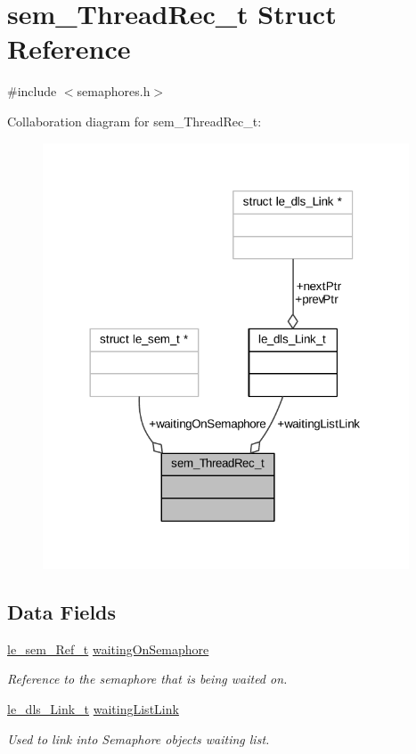 \hypertarget{structsem___thread_rec__t}{}\section{sem\+\_\+\+Thread\+Rec\+\_\+t Struct Reference}
\label{structsem___thread_rec__t}


{\ttfamily \#include $<$semaphores.\+h$>$}



Collaboration diagram for sem\+\_\+\+Thread\+Rec\+\_\+t\+:
\nopagebreak
\begin{figure}[H]
\begin{center}
\leavevmode
\includegraphics[width=308pt]{structsem___thread_rec__t__coll__graph}
\end{center}
\end{figure}
\subsection*{Data Fields}
\begin{DoxyCompactItemize}
\item 
\hyperlink{le__semaphore_8h_a25b1300f952a83efe8ad0a321f2d06dc}{le\+\_\+sem\+\_\+\+Ref\+\_\+t} \hyperlink{structsem___thread_rec__t_a11de598ac838248b7c43729f9d869315}{waiting\+On\+Semaphore}
\begin{DoxyCompactList}\small\item\em Reference to the semaphore that is being waited on. \end{DoxyCompactList}\item 
\hyperlink{structle__dls___link__t}{le\+\_\+dls\+\_\+\+Link\+\_\+t} \hyperlink{structsem___thread_rec__t_abedbcd352d31de69c76877a8db79c6c7}{waiting\+List\+Link}
\begin{DoxyCompactList}\small\item\em Used to link into Semaphore object\textquotesingle{}s waiting list. \end{DoxyCompactList}\end{DoxyCompactItemize}


